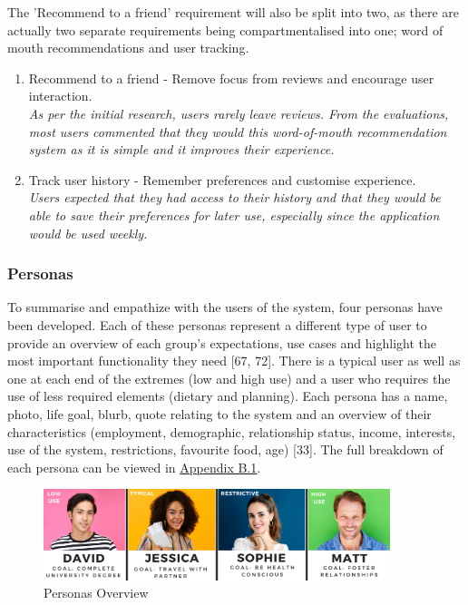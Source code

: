 \documentclass[a4 paper, 12pt]{article}
\begin{document}
    The 'Recommend to a friend' requirement will also be split into two, as there are actually two separate requirements being compartmentalised into one; word of mouth recommendations and user tracking. 
        \begin{enumerate}[resume]
            \item Recommend to a friend - Remove focus from reviews and encourage user interaction. \\
                \textit{As per the initial research, users rarely leave reviews. From the evaluations, most users commented that they would this word-of-mouth recommendation system as it is simple and it improves their experience.}
            \item Track user history - Remember preferences and customise experience. \\
                \textit{Users expected that they had access to their history and that they would be able to save their preferences for later use, especially since the application would be used weekly.}
        \end{enumerate}
 
    \subsubsection{Personas}
    To summarise and empathize with the users of the system, four personas have been developed. Each of these personas represent a different type of user to provide an overview of each group's expectations, use cases and highlight the most important functionality they need [67, 72]. There is a typical user as well as one at each end of the extremes (low and high use) and a user who requires the use of less required elements (dietary and planning). Each persona has a name, photo, life goal, blurb, quote relating to the system and an overview of their characteristics (employment, demographic, relationship status, income, interests, use of the system, restrictions, favourite food, age) [33]. The full breakdown of each persona can be viewed in \hyperref[sec:B.1]{Appendix B.1}.
    \begin{figure} [H]
        \centering
        \includegraphics[width=0.9\textwidth, frame]
            {./Med_Fidelity/Med_Report/images/personas_overview.PNG}  
        \caption{Personas Overview}
    \end{figure} 
    
\end{document}
